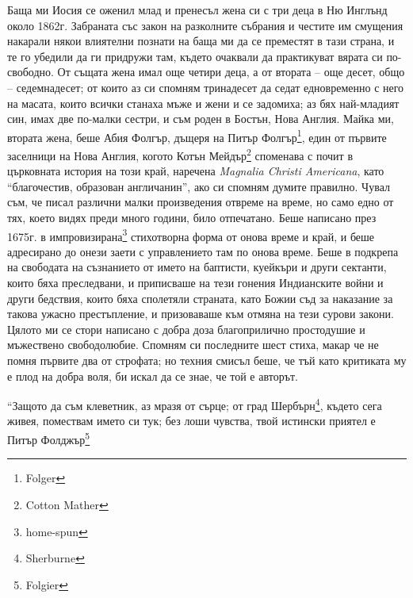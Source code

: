 \documentclass[12pt]{book}
\begin{document}
Баща ми Иосия се оженил млад и пренесъл жена си с три деца в Ню Инглънд около 1862г. Забраната със закон на разколните събрания и честите им смущения накарали някои влиятелни познати на баща ми да се преместят в тази страна, и те го убедили да ги придружи там, където очаквали да практикуват вярата си по-свободно. От същата жена имал още четири деца, а от втората – още десет, общо – седемнадесет; от които аз си спомням тринадесет да седат едновременно с него на масата, които всички станаха мъже и жени и се задомиха; аз бях най-младият син, имах две по-малки сестри, и съм роден в  Бостън, Нова Англия. Майка ми, втората жена, беше Абия Фолгър, дъщеря на Питър Фолгър\footnote{Folger}, един от първите заселници на Нова Англия, когото Котън Мейдър\footnote{Cotton Mather} споменава с почит в църковната история на този край, наречена \textit{Magnalia Christi Americana}, като “благочестив, образован англичанин”, ако си спомням думите правилно. Чувал съм, че писал различни малки произведения отвреме на време, но само едно от тях, което видях преди много години, било отпечатано. Беше написано през 1675г. в импровизирана\footnote{home-spun} стихотворна форма от онова време и край, и беше адресирано до онези заети с управлението там по онова време. Беше в подкрепа на свободата на съзнанието от името на баптисти, куейкъри и други сектанти, които бяха преследвани, и приписваше на тези гонения Индианските войни и други бедствия, които бяха сполетяли страната, като Божии съд за наказание за такова ужасно престъпление, и призоваваше към отмяна на тези сурови закони. Цялото ми се стори написано с добра доза благоприлично простодушие и мъжествено свободолюбие. Спомням си последните шест стиха, макар че не помня първите два от строфата; но техния смисъл беше, че тъй като критиката му е плод на добра воля, би искал да се знае, че той е авторът.



	“Защото да съм клеветник,
	аз мразя от сърце;
	от град Шербърн\footnote{Sherburne}, където сега живея,
	помествам името си тук;
	без лоши чувства, твой истински приятел
	е Питър Фолджър\footnote{Folgier}
\end{document}
